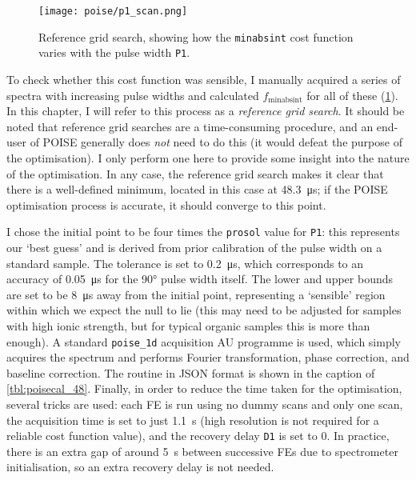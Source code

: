 \begin{figure}[htb]
    \centering
    \texttt{[image: poise/p1\_scan.png]}%
    \caption[Reference grid search for pulse width optimisation]{
        Reference grid search, showing how the \texttt{minabsint} cost function varies with the pulse width \texttt{P1}.
    }
    \label{fig:p1_scan}
\end{figure}

To check whether this cost function was sensible, I manually acquired a series of spectra with increasing pulse widths and calculated $f_\text{minabsint}$ for all of these (\cref{fig:p1_scan}).
In this chapter, I will refer to this process as a \textit{reference grid search}.
It should be noted that reference grid searches are a time-consuming procedure, and an end-user of POISE generally does \textit{not} need to do this (it would defeat the purpose of the optimisation).
I only perform one here to provide some insight into the nature of the optimisation.
In any case, the reference grid search makes it clear that there is a well-defined minimum, located in this case at \qty{48.3}{\us}; if the POISE optimisation process is accurate, it should converge to this point.

I chose the initial point to be four times the \texttt{prosol} value for \texttt{P1}: this represents our `best guess' and is derived from prior calibration of the pulse width on a standard sample.
The tolerance is set to \qty{0.2}{\us}, which corresponds to an accuracy of \qty{0.05}{\us} for the \ang{90} pulse width itself.
The lower and upper bounds are set to be \qty{8}{\us} away from the initial point, representing a `sensible' region within which we expect the null to lie (this may need to be adjusted for samples with high ionic strength, but for typical organic samples this is more than enough).
A standard \texttt{poise\_1d} acquisition AU programme is used, which simply acquires the spectrum and performs Fourier transformation, phase correction, and baseline correction.
The routine in JSON format is shown in the caption of \cref{tbl:poisecal_48}.
Finally, in order to reduce the time taken for the optimisation, several tricks are used: each FE is run using no dummy scans and only one scan, the acquisition time is set to just \qty{1.1}{\s} (high resolution is not required for a reliable cost function value), and the recovery delay \texttt{D1} is set to 0.
In practice, there is an extra gap of around \qty{5}{\s} between successive FEs due to spectrometer initialisation, so an extra recovery delay is not needed.


